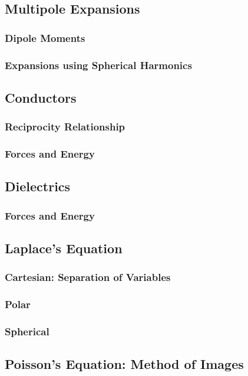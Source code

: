 \documentclass[]{article}
\begin{document}
\subsection{Multipole Expansions}
\subsubsection{Dipole Moments}
\subsubsection{Expansions using Spherical Harmonics}

\subsection{Conductors}
\subsubsection{Reciprocity Relationship}
\subsubsection{Forces and Energy}

\subsection{Dielectrics}
\subsubsection{Forces and Energy}

\subsection{Laplace's Equation}
\subsubsection{Cartesian: Separation of Variables}
\subsubsection{Polar}
\subsubsection{Spherical}

\subsection{Poisson's Equation: Method of Images}
\end{document}
